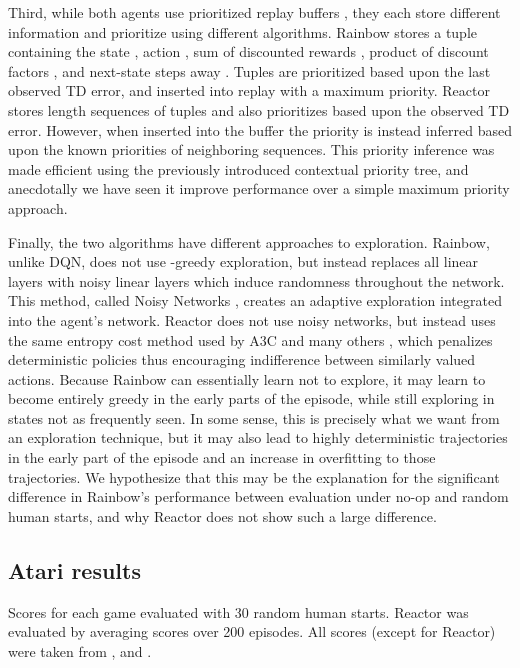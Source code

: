 \documentclass{article}
\begin{document}
Third, while both agents use prioritized replay buffers 
\citep{schaul16prioritized}, they each store different information and 
prioritize using different algorithms. Rainbow stores a tuple containing the 
state , action , sum of  discounted rewards 
, product of  
discount factors , and next-state  steps away 
. Tuples are prioritized based upon the last observed TD error, and 
inserted into replay with a maximum priority. Reactor stores length  
sequences of tuples  and also prioritizes 
based upon the observed TD error. However, when inserted into the buffer the 
priority is instead inferred based upon the known priorities of neighboring 
sequences. This priority inference was made efficient using the previously 
introduced contextual priority tree, and anecdotally we have seen it improve 
performance over a simple maximum priority approach.

Finally, the two algorithms have different approaches to exploration. 
Rainbow, unlike DQN, does not use -greedy exploration, but instead 
replaces all linear layers with noisy linear layers which induce randomness 
throughout the network. This method, called Noisy Networks 
\citep{fortunato2017noisy}, creates an adaptive exploration integrated into the 
agent's network. Reactor does not use noisy networks, but instead uses the same 
entropy cost method used by A3C and many others \citep{mnih2016asynchronous}, 
which penalizes deterministic policies thus encouraging indifference between 
similarly valued actions. Because Rainbow can essentially learn not to explore, 
it may learn to become entirely greedy in the early parts of the episode, while 
still exploring in states not as frequently seen. In some sense, this is 
precisely what we want from an exploration technique, but it may also lead to 
highly deterministic trajectories in the early part of the episode and an 
increase in overfitting to those trajectories. We hypothesize that this may be 
the explanation for the significant difference in Rainbow's performance between 
evaluation under no-op and random human starts, and why Reactor does not show 
such a large difference.


\subsection{Atari results}

\begin{table}[h]
\caption{Scores for each game evaluated with 30 random human starts. Reactor 
was evaluated by averaging scores over 200 episodes. All scores (except for 
Reactor) were taken from \cite{wang2015dueling}, \cite{mnih2016asynchronous} 
and 
\cite{rainbow}.}
\label{raw-scores-human}
\begin{scriptsize}
\begin{sc}
\tiny

\end{sc}
\end{scriptsize}
\end{table}
\end{document}
